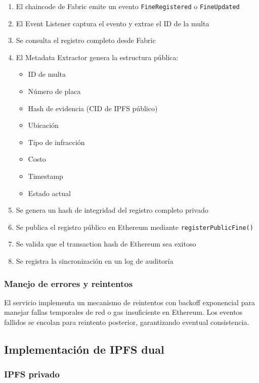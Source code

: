 \begin{enumerate}
    \item El chaincode de Fabric emite un evento \texttt{FineRegistered} o \texttt{FineUpdated}
    \item El Event Listener captura el evento y extrae el ID de la multa
    \item Se consulta el registro completo desde Fabric
    \item El Metadata Extractor genera la estructura pública:
    \begin{itemize}
        \item ID de multa
        \item Número de placa
        \item Hash de evidencia (CID de IPFS público)
        \item Ubicación
        \item Tipo de infracción
        \item Costo
        \item Timestamp
        \item Estado actual
    \end{itemize}
    \item Se genera un hash de integridad del registro completo privado
    \item Se publica el registro público en Ethereum mediante \texttt{registerPublicFine()}
    \item Se valida que el transaction hash de Ethereum sea exitoso
    \item Se registra la sincronización en un log de auditoría
\end{enumerate}

\subsubsection{Manejo de errores y reintentos}

El servicio implementa un mecanismo de reintentos con backoff exponencial para manejar fallas temporales de red o gas insuficiente en Ethereum. Los eventos fallidos se encolan para reintento posterior, garantizando eventual consistencia.

\subsection{Implementación de IPFS dual}

\subsubsection{IPFS privado}

